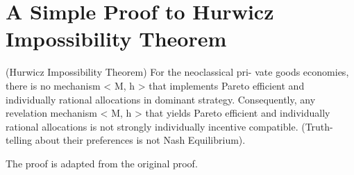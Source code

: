 
\chapter{A Simple Proof to Hurwicz Impossibility Theorem} %

\label{Appendix_B} %

\begin{thm*}
(Hurwicz Impossibility Theorem) For the neoclassical pri-
vate goods economies, there is no mechanism < M, h > that implements Pareto efficient
and individually rational allocations in dominant strategy. Consequently, any revelation
mechanism < M, h > that yields Pareto efficient and individually rational allocations is
not strongly individually incentive compatible. (Truth-telling about their preferences is not
Nash Equilibrium).
\end{thm*}
The proof is adapted from the original proof.
